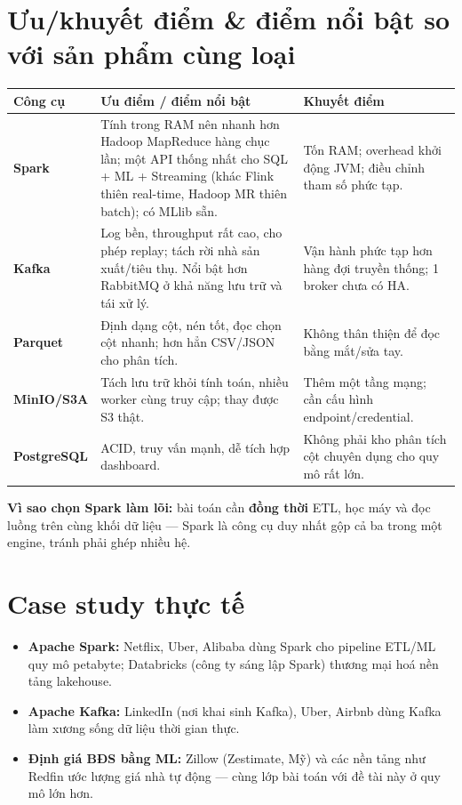 \documentclass[12pt,a4paper]{article}
\begin{document}
\section{Ưu/khuyết điểm \& điểm nổi bật so với sản phẩm cùng loại}

\begin{center}
\begin{longtable}{@{}p{2.6cm} p{5.3cm} p{5.6cm}@{}}
\toprule
\textbf{Công cụ} & \textbf{Ưu điểm / điểm nổi bật} & \textbf{Khuyết điểm} \\
\midrule
\endhead
\textbf{Spark} & Tính trong RAM nên nhanh hơn Hadoop MapReduce hàng chục lần; một API thống nhất cho SQL + ML + Streaming (khác Flink thiên real-time, Hadoop MR thiên batch); có MLlib sẵn. & Tốn RAM; overhead khởi động JVM; điều chỉnh tham số phức tạp. \\
\textbf{Kafka} & Log bền, throughput rất cao, cho phép replay; tách rời nhà sản xuất/tiêu thụ. Nổi bật hơn RabbitMQ ở khả năng lưu trữ và tái xử lý. & Vận hành phức tạp hơn hàng đợi truyền thống; 1 broker chưa có HA. \\
\textbf{Parquet} & Định dạng cột, nén tốt, đọc chọn cột nhanh; hơn hẳn CSV/JSON cho phân tích. & Không thân thiện để đọc bằng mắt/sửa tay. \\
\textbf{MinIO/S3A} & Tách lưu trữ khỏi tính toán, nhiều worker cùng truy cập; thay được S3 thật. & Thêm một tầng mạng; cần cấu hình endpoint/credential. \\
\textbf{PostgreSQL} & ACID, truy vấn mạnh, dễ tích hợp dashboard. & Không phải kho phân tích cột chuyên dụng cho quy mô rất lớn. \\
\bottomrule
\end{longtable}
\end{center}

\noindent\textbf{Vì sao chọn Spark làm lõi:} bài toán cần \textbf{đồng thời} ETL, học máy và đọc luồng trên cùng khối dữ liệu — Spark là công cụ duy nhất gộp cả ba trong một engine, tránh phải ghép nhiều hệ.

\section{Case study thực tế}
\begin{itemize}[nosep]
  \item \textbf{Apache Spark:} Netflix, Uber, Alibaba dùng Spark cho pipeline ETL/ML quy mô petabyte; Databricks (công ty sáng lập Spark) thương mại hoá nền tảng lakehouse.
  \item \textbf{Apache Kafka:} LinkedIn (nơi khai sinh Kafka), Uber, Airbnb dùng Kafka làm xương sống dữ liệu thời gian thực.
  \item \textbf{Định giá BĐS bằng ML:} Zillow (Zestimate, Mỹ) và các nền tảng như Redfin ước lượng giá nhà tự động — cùng lớp bài toán với đề tài này ở quy mô lớn hơn.
\end{itemize}
\end{document}
